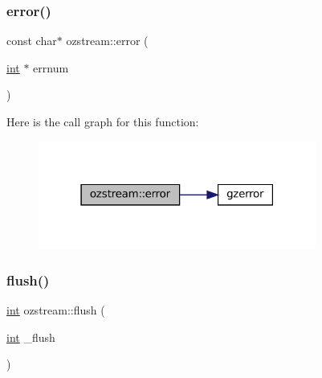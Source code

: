 \subsubsection{\texorpdfstring{error()}{error()}}
{\footnotesize\ttfamily const char$\ast$ ozstream\+::error (\begin{DoxyParamCaption}\item[{\mbox{\hyperlink{ioapi_8h_a787fa3cf048117ba7123753c1e74fcd6}{int}} $\ast$}]{errnum }\end{DoxyParamCaption})\hspace{0.3cm}{\ttfamily [inline]}}

Here is the call graph for this function\+:
\nopagebreak
\begin{figure}[H]
\begin{center}
\leavevmode
\includegraphics[width=259pt]{classozstream_a189c85676e712ba4776bb17e1de22388_cgraph}
\end{center}
\end{figure}
\mbox{\label{classozstream_a0fc1b5181044b8d6b6aed0381e8f449c}} 
\subsubsection{\texorpdfstring{flush()}{flush()}}
{\footnotesize\ttfamily \mbox{\hyperlink{ioapi_8h_a787fa3cf048117ba7123753c1e74fcd6}{int}} ozstream\+::flush (\begin{DoxyParamCaption}\item[{\mbox{\hyperlink{ioapi_8h_a787fa3cf048117ba7123753c1e74fcd6}{int}}}]{\+\_\+flush }\end{DoxyParamCaption})\hspace{0.3cm}{\ttfamily [inline]}}

